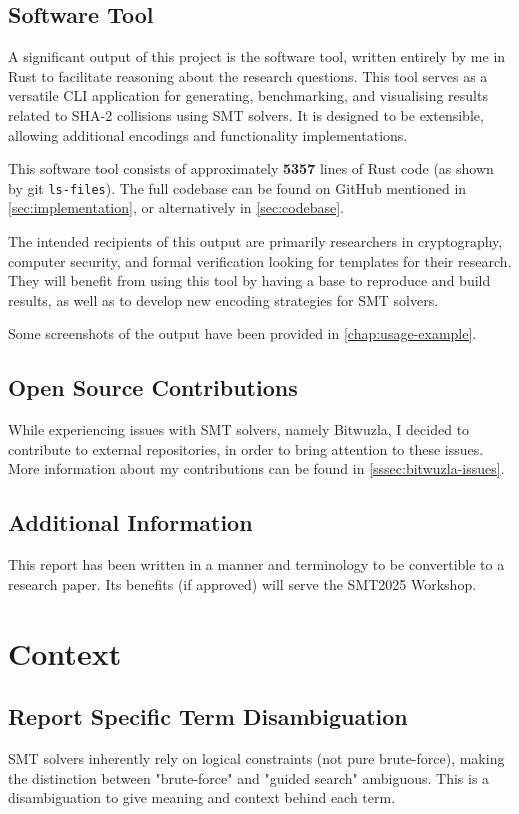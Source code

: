 \documentclass[a4paper]{report}
\begin{document}
\section{Software Tool}
A significant output of this project is the software tool, written entirely by me in Rust to facilitate reasoning about the research questions.
This tool serves as a versatile CLI application for generating, benchmarking, and visualising results related to SHA-2 collisions using SMT solvers.
It is designed to be extensible, allowing additional encodings and functionality implementations.

This software tool consists of approximately \textbf{5357} lines of Rust code (as shown by git \texttt{ls-files}). \cite{git_ls_files}
The full codebase can be found on GitHub mentioned in \ref{sec:implementation}, or alternatively in \ref{sec:codebase}.

The intended recipients of this output are primarily researchers in cryptography, computer security, and formal verification looking for templates for their research.
They will benefit from using this tool by having a base to reproduce and build results, as well as to develop new encoding strategies for SMT solvers.

Some screenshots of the output have been provided in \ref{chap:usage-example}.

\section{Open Source Contributions}
While experiencing issues with SMT solvers, namely Bitwuzla, I decided to contribute to external repositories, in order to bring attention to these issues.
More information about my contributions can be found in \ref{sssec:bitwuzla-issues}.

\section{Additional Information}
This report has been written in a manner and terminology to be convertible to a research paper.
Its benefits (if approved) will serve the SMT2025 Workshop. \cite{smt2025}


\chapter{Context}
\section{Report Specific Term Disambiguation}
SMT solvers inherently rely on logical constraints (not pure brute-force), making the distinction between "brute-force" and "guided search" ambiguous.
This is a disambiguation to give meaning and context behind each term.
\end{document}
